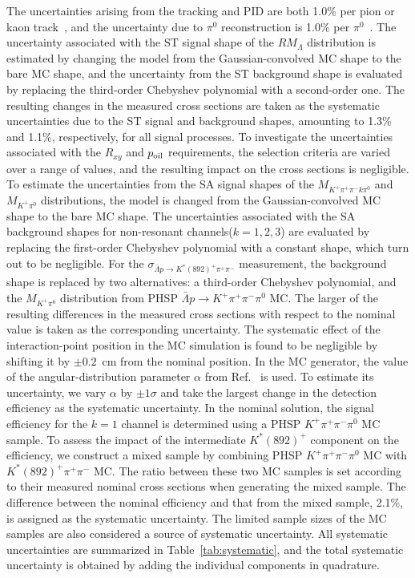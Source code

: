 \documentclass[prd,aps,reprint,noeprint,superscriptaddress,amsmath, amssymb]{revtex4-1}
\begin{document}
The uncertainties arising from the tracking and PID are both 1.0\% per pion or kaon track~\cite{BESIII:2018ldc, BESIII:2024nif},
and the uncertainty due to $\pi^0$ reconstruction is 1.0\% per $\pi^0$~\cite{BESIII:2023ldd, BESIII:2023drj}.
The uncertainty associated with the ST signal shape of the $RM_{\Lambda}$ distribution is estimated by changing the model from
the Gaussian-convolved MC shape to the bare MC shape,
and the uncertainty from the ST background shape is evaluated by replacing the third-order Chebyshev polynomial with a second-order one.
The resulting changes in the measured cross sections are taken as the systematic uncertainties due to the ST signal and background shapes,
amounting to 1.3\% and 1.1\%, respectively, for all signal processes.
To investigate the uncertainties associated with the $R_{xy}$ and $p_{\rm oil}$ requirements,
the selection criteria are varied over a range of values, and the resulting impact on the cross sections is negligible.
To estimate the uncertainties from the SA signal shapes of the $M_{K^+\pi^+\pi^-k\pi^0}$ and $M_{K^+\pi^0}$ distributions,
the model is changed from the Gaussian-convolved MC shape to the bare MC shape.
The uncertainties associated with the SA background shapes for non-resonant channels($k=1,2,3$) are evaluated by replacing the first-order Chebyshev polynomial with a constant shape, which turn out to be negligible.
For the $\sigma_{\bar{\Lambda} p \to  K^{*}(892)^{+}\pi^+\pi^-}$ measurement, the background
shape is replaced by two alternatives: a third-order Chebyshev polynomial, and the $M_{K^+\pi^0}$ distribution from PHSP $\bar{\Lambda} p \to K^{+}\pi^+\pi^-\pi^0$ MC.
The larger of the resulting differences in the measured cross sections with respect to the nominal value is taken as the corresponding uncertainty.
The systematic effect of the interaction-point position in the MC simulation is found to be negligible by shifting
it by $\pm 0.2$~cm from the nominal position.
In the MC generator, the value of the angular-distribution parameter $\alpha$ from Ref.~\cite{BESIII:2022qax} is used.
To estimate its uncertainty, we vary $\alpha$ by $\pm 1\sigma$
and take the largest change in the detection efficiency as the systematic uncertainty.
In the nominal solution, the signal efficiency for the $k=1$ channel is determined using a PHSP $K^+\pi^+\pi^-\pi^0$ MC sample.
To assess the impact of the intermediate $K^{*}(892)^{+}$ component on the efficiency, we construct a mixed sample by combining
PHSP $K^+\pi^+\pi^-\pi^0$ MC with $K^{*}(892)^+\pi^+\pi^-$ MC. The ratio between these two MC samples is set according to their measured nominal cross sections when generating the mixed sample.
The difference between the nominal efficiency and that from the mixed sample, 2.1\%, is assigned as the systematic uncertainty.
The limited sample sizes of the MC samples are also considered a source of systematic uncertainty.
All systematic uncertainties are summarized in Table~\ref{tab:systematic},
and the total systematic uncertainty is obtained by adding the individual components in quadrature.
\end{document}
